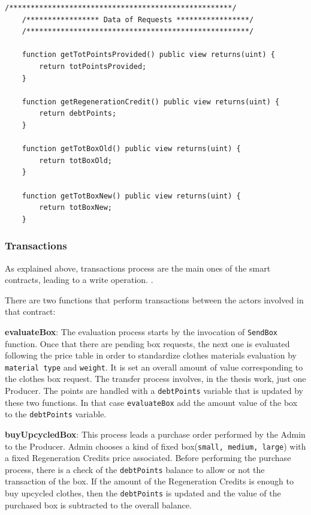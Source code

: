 \begin{lstlisting}[language=Solidity]
    /****************************************************/
    /***************** Data of Requests *****************/
    /****************************************************/

    function getTotPointsProvided() public view returns(uint) {
        return totPointsProvided;
    }

    function getRegenerationCredit() public view returns(uint) {
        return debtPoints;
    }

    function getTotBoxOld() public view returns(uint) {
        return totBoxOld;
    }

    function getTotBoxNew() public view returns(uint) {
        return totBoxNew;
    }

\end{lstlisting}

\subsubsection{Transactions}

As explained above, transactions process are the main ones of the smart contracts, leading to a write
operation.
\bigskip.

There are two functions that perform transactions between the actors involved in that contract:

\begin{outline}[enumerate]
    \1 \textbf{evaluateBox}: The evaluation process starts by the invocation of \texttt{SendBox} function.
    Once that there are pending box requests, the next one is evaluated following
    the price table in order to standardize clothes materials evaluation by \texttt{material type} and \texttt{weight}.
    It is set an overall amount of value corresponding to the clothes box request.
    The transfer process involves, in the thesis work, just one Producer. The points are 
    handled with a \texttt{debtPoints} variable that is updated by these two functions. In that
    case \texttt{evaluateBox} add the amount value of the box to the \texttt{debtPoints} variable. 

    \1 \textbf{buyUpcycledBox}: This process leads a purchase order performed by the Admin to the 
    Producer. Admin chooses a kind of fixed box(\texttt{small, medium, large}) with a fixed Regeneration
    Credits price associated. Before performing the purchase process, there is a check of the \texttt{debtPoints}
    balance to allow or not the transaction of the box. If the amount of the Regeneration Credits
    is enough to buy upcycled clothes, then the \texttt{debtPoints} is updated and the value of the
    purchased box is subtracted to the overall balance. 
\end{outline}

